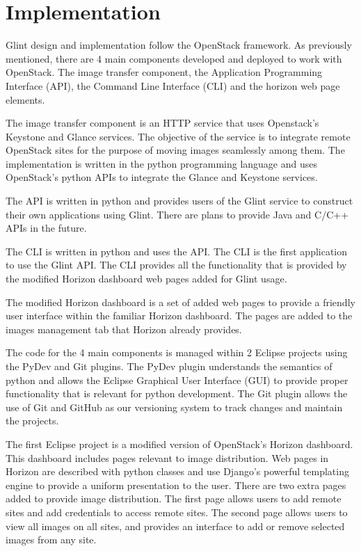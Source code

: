 \documentclass[a4paper]{jpconf}
\begin{document}
\section{Implementation}

Glint design and implementation follow the OpenStack framework. As previously mentioned, there are 4 main components developed and deployed to work with OpenStack. The image transfer component, the Application Programming Interface (API), the Command Line Interface (CLI) and the horizon web page elements. 

The image transfer component is an HTTP service that uses Openstack's Keystone and Glance services. The objective of the service is to integrate remote OpenStack sites for the purpose of moving images seamlessly among them. The implementation is written in the python programming language and uses OpenStack's python APIs to integrate the Glance and Keystone services.

The API is written in python and provides users of the Glint service to construct their own applications using Glint. There are plans to provide Java and C/C++ APIs in the future.

The CLI is written in python and uses the API. The CLI is the first application to use the Glint API. The CLI provides all the functionality that is provided by the modified Horizon dashboard web pages added for Glint usage.

The modified Horizon dashboard is a set of added web pages to provide a friendly user interface within the familiar Horizon dashboard. The pages are added to the images management tab that Horizon already provides. 

The code for the 4 main components is managed within 2 Eclipse projects using the PyDev and Git plugins. The PyDev plugin understands the semantics of python and allows the Eclipse Graphical User Interface (GUI) to provide proper functionality that is relevant for python development. The Git plugin allows the use of Git and GitHub as our versioning system to track changes and maintain the projects. 

The first Eclipse project is a modified version of OpenStack's Horizon dashboard. This dashboard includes pages relevant to image distribution. Web pages in Horizon are described with python classes and use Django's powerful templating engine to provide a uniform presentation to the user. There are two extra pages added to provide image distribution. The first page allows users to add remote sites and add credentials to access remote sites. The second page allows users to view all images on all sites, and provides an interface to add or remove selected images from any site.
\end{document}
